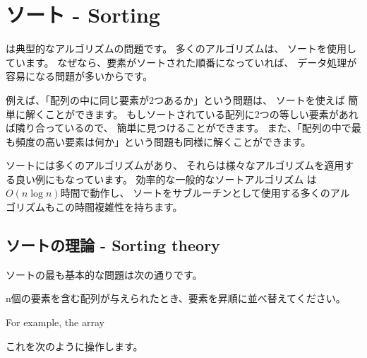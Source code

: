 \chapter{ソート - Sorting}


は典型的なアルゴリズムの問題です。
多くのアルゴリズムは、
ソートを使用しています。
なぜなら、要素がソートされた順番になっていれば、
データ処理が容易になる問題が多いからです。

例えば、「配列の中に同じ要素が2つあるか」という問題は、
ソートを使えば 簡単に解くことができます。
もしソートされている配列に2つの等しい要素があれば隣り合っているので、
簡単に見つけることができます。
また、「配列の中で最 も頻度の高い要素は何か」という問題も同様に解くことができます。

ソートには多くのアルゴリズムがあり、
それらは様々なアルゴリズムを適用する良い例にもなっています。
効率的な一般的なソートアルゴリズム は $O(n \log n)$時間で動作し、
ソートをサブルーチンとして使用する多くのアル ゴリズムもこの時間複雑性を持ちます。

\section{ソートの理論 - Sorting theory}

ソートの最も基本的な問題は次の通りです。
\begin{framed}
\noindent
 n個の要素を含む配列が与えられたとき、要素を昇順に並べ替えてください。
\end{framed}
\noindent
For example, the array
\begin{center}
\end{center}
これを次のように操作します。
\begin{center}
\end{center}

